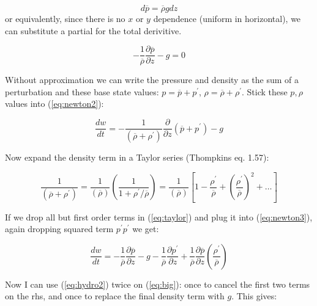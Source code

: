 \documentclass[12pt]{article}
\begin{document}
\begin{equation}
  \label{eq:hydro}
  d \overline{p} = \overline{\rho} g dz
\end{equation}
or equivalently, since there is no $x$ or $y$ dependence (uniform in horizontal),
we can substitute a partial for the total derivitive.

\begin{equation}
  \label{eq:hydro2}
- \frac{1}{\overline{\rho}} \frac{\partial \overline{p}}{\partial z} -  g  = 0
\end{equation}



Without approximation we can write the pressure and density as the sum
of a perturbation and these base state values:  $p=\overline{p} +
p^\prime$, $\rho=\overline{\rho} + \rho^\prime$.  
Stick these $p,\rho$ values into
(\ref{eq:newton2}):

  \begin{equation}
  \label{eq:newton3}
 \frac{dw}{dt} = -\frac{1}{(\overline{\rho} + \rho^\prime)}
 \frac{\partial }{\partial z}
(\overline{p} + p^\prime) -  g
\end{equation}

Now expand the density term in a Taylor series (Thompkins eq. 1.57):


\begin{equation}
  \label{eq:taylor}
  \frac{1}{(\overline{\rho} + \rho^\prime)} = 
\frac{1}{(\overline{\rho})} 
  \left ( \frac{1}{1 + \rho^\prime/\overline{\rho}} \right ) =
\frac{1}{(\overline{\rho})} \left [ 1 -
  \frac{\rho^\prime}{\overline{\rho}} + 
\left ( \frac{\rho^\prime}{\overline{\rho}} \right )^2 + \ldots \right  ]
\end{equation}

If we drop all but first order terms in (\ref{eq:taylor})  and plug it
into (\ref{eq:newton3}), again dropping  squared term
$p^\prime p^\prime$ we get:

\begin{equation}
  \label{eq:big}
\frac{dw}{dt} = -\frac{1}{\overline{\rho}} \frac{\partial
  \overline{p}}{\partial z}
-g - \frac{1}{\overline{\rho}} \frac{\partial p^\prime}{\partial z}  
+ \frac{1}{\overline{\rho}} \frac{\partial \overline{p}}{\partial z} 
\left ( \frac{\rho^\prime}{\overline{\rho}} \right )
\end{equation} 


  Now I can use (\ref{eq:hydro2}) twice on (\ref{eq:big}): once to
cancel the first two terms on the rhs, and once to replace the final density
term with $g$. This gives:
\end{document}
